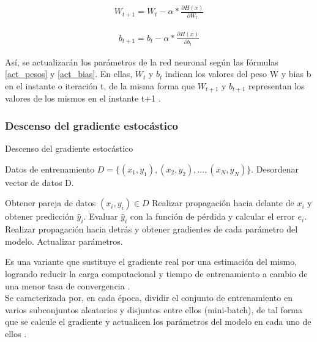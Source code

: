 \begin{gather}
	W_{t+1} = W_{t} - \alpha * \frac{\partial H(x)}{\partial W_{t}} 
	\label{act_pesos}
\end{gather}

\begin{gather}
	b_{t+1} = b_{t} - \alpha * \frac{\partial H(x)}{\partial b_{t}}
	\label{act_bias}
\end{gather}


Así, se actualizarán los parámetros de la red neuronal según las fórmulas \ref{act_pesos} y \ref{act_bias}. En ellas, $W_t$ y $b_t$ indican los valores del peso W y bias b en el instante o iteración t, de la misma forma que $W_{t+1}$ y $b_{t+1}$ representan los valores de los mismos en el instante t+1 \cite{SGD_act_params}.

\subsubsection{Descenso del gradiente estocástico}

\begin{algorithm}[H]
	\caption{Descenso del gradiente estocástico \cite{SGD_3}} 
	\begin{algorithmic}
		\State Datos de entrenamiento $D=\{(x_1, y_1), (x_2, y_2), ..., (x_N, y_N)\}$.
			\State Desordenar vector de datos D.
			
				\State Obtener pareja de datos $(x_i, y_i) \in D$
				\State Realizar propagación hacia delante de $x_i$ y obtener predicción $\hat{y}_i$.
				\State Evaluar $\hat{y}_i$ con la función de pérdida y calcular el error $e_i$.
				\State Realizar propagación hacia detrás y obtener gradientes 
				\State      de cada parámetro del modelo.
				\State Actualizar parámetros.
			\EndFor
		\EndFor
	\end{algorithmic}
\end{algorithm}

Es una variante que sustituye el gradiente real por una estimación del mismo, logrando reducir la carga computacional y tiempo de entrenamiento a cambio de una menor tasa de convergencia \cite{sgd_stocastico} \cite{sgd_stocastico_1}. \\
Se caracterizada por, en cada época, dividir el conjunto de entrenamiento en varios subconjuntos aleatorios y disjuntos entre ellos (mini-batch), de tal forma que se calcule el gradiente y actualicen los parámetros del modelo en cada uno de ellos \cite{sgd_stocastico}. \\

